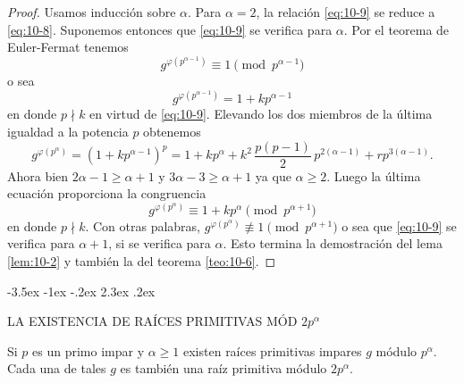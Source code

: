 \documentclass[12pt,a4paper]{book}
\makeatletter
\renewcommand\section{\@startsection{section}{1}{\z@}%
  {-3.5ex \@plus -1ex \@minus -.2ex}%
  {2.3ex \@plus .2ex}%
  {\normalfont\Large\bfseries\raggedright}}
\makeatother
\begin{document}
    \begin{proof}
        Usamos inducción sobre $\alpha$. Para $\alpha=2$, la relación \eqref{eq:10-9} se
        reduce a \eqref{eq:10-8}. Suponemos entonces que \eqref{eq:10-9} se verifica para
        $\alpha$. Por el teorema de Euler-Fermat tenemos
        \begin{equation*}
            g^{\varphi(p^{\alpha-1})}\equiv1\pmod{p^{\alpha-1}}
        \end{equation*}
        o sea
        \begin{equation*}
            g^{\varphi(p^{\alpha-1})}=1+kp^{\alpha-1}
        \end{equation*}
        en donde $p\nmid k$ en virtud de \eqref{eq:10-9}. Elevando los dos miembros de la
        última igualdad a la potencia $p$ obtenemos
        \begin{equation*}
            g^{\varphi(p^{\alpha})}=(1+kp^{\alpha-1})^{p}=1+kp^{\alpha}+k^{2}\,\frac{p(p-1)}{2}\,p^{2(\alpha-1)}+rp^{3(\alpha-1)}.
        \end{equation*}
        Ahora bien $2\alpha-1\geq\alpha+1$ y $3\alpha-3\geq\alpha+1$ ya que $\alpha\geq2$.
        Luego la última ecuación proporciona la congruencia
        \begin{equation*}
            g^{\varphi(p^{\alpha})}\equiv1+kp^{\alpha}\pmod{p^{\alpha+1}}
        \end{equation*}
        en donde $p\nmid k$. Con otras palabras, $g^{\varphi(p^{\alpha})}\not\equiv1\pmod{p^{\alpha+1}}$
        o sea que \eqref{eq:10-9} se verifica para $\alpha+1$, si se verifica para $\alpha$.
        Esto termina la demostración del lema \ref{lem:10-2} y también la del teorema
        \ref{teo:10-6}.
    \end{proof}

    \section{LA EXISTENCIA DE RAÍCES PRIMITIVAS MÓD \texorpdfstring{$2p^{\alpha}$}{2p\textasciicircum{}α}}
    \begin{teorema}\label{teo:10-7}
        Si $p$ es un primo impar y $\alpha\geq1$ existen raíces primitivas impares $g$ módulo
        $p^{\alpha}$. Cada una de tales $g$ es también una raíz primitiva módulo
        $2p^{\alpha}$.
    \end{teorema}
\end{document}
